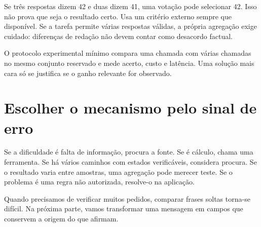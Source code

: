 Se três respostas dizem 42 e duas dizem 41, uma votação pode selecionar 42. Isso não prova que seja o resultado certo. Usa um critério externo sempre que disponível. Se a tarefa permite várias respostas válidas, a própria agregação exige cuidado: diferenças de redação não devem contar como desacordo factual.

O protocolo experimental mínimo compara uma chamada com várias chamadas no mesmo conjunto reservado e mede acerto, custo e latência. Uma solução mais cara só se justifica se o ganho relevante for observado.

\section{Escolher o mecanismo pelo sinal de erro}
Se a dificuldade é falta de informação, procura a fonte. Se é cálculo, chama uma ferramenta. Se há vários caminhos com estados verificáveis, considera procura. Se o resultado varia entre amostras, uma agregação pode merecer teste. Se o problema é uma regra não autorizada, resolve-o na aplicação.

Quando precisamos de verificar muitos pedidos, comparar frases soltas torna-se difícil. Na próxima parte, vamos transformar uma mensagem em campos que conservem a origem do que afirmam.
